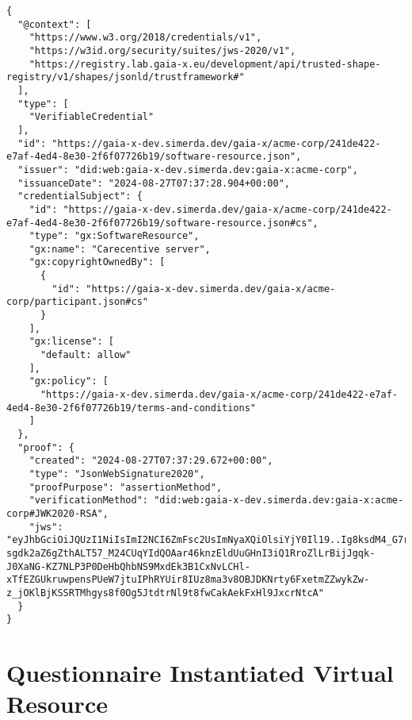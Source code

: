 \begin{verbatim}
{
  "@context": [
    "https://www.w3.org/2018/credentials/v1",
    "https://w3id.org/security/suites/jws-2020/v1",
    "https://registry.lab.gaia-x.eu/development/api/trusted-shape-registry/v1/shapes/jsonld/trustframework#"
  ],
  "type": [
    "VerifiableCredential"
  ],
  "id": "https://gaia-x-dev.simerda.dev/gaia-x/acme-corp/241de422-e7af-4ed4-8e30-2f6f07726b19/software-resource.json",
  "issuer": "did:web:gaia-x-dev.simerda.dev:gaia-x:acme-corp",
  "issuanceDate": "2024-08-27T07:37:28.904+00:00",
  "credentialSubject": {
    "id": "https://gaia-x-dev.simerda.dev/gaia-x/acme-corp/241de422-e7af-4ed4-8e30-2f6f07726b19/software-resource.json#cs",
    "type": "gx:SoftwareResource",
    "gx:name": "Carecentive server",
    "gx:copyrightOwnedBy": [
      {
        "id": "https://gaia-x-dev.simerda.dev/gaia-x/acme-corp/participant.json#cs"
      }
    ],
    "gx:license": [
      "default: allow"
    ],
    "gx:policy": [
      "https://gaia-x-dev.simerda.dev/gaia-x/acme-corp/241de422-e7af-4ed4-8e30-2f6f07726b19/terms-and-conditions"
    ]
  },
  "proof": {
    "created": "2024-08-27T07:37:29.672+00:00",
    "type": "JsonWebSignature2020",
    "proofPurpose": "assertionMethod",
    "verificationMethod": "did:web:gaia-x-dev.simerda.dev:gaia-x:acme-corp#JWK2020-RSA",
    "jws": "eyJhbGciOiJQUzI1NiIsImI2NCI6ZmFsc2UsImNyaXQiOlsiYjY0Il19..Ig8ksdM4_G7r2GbAkTRZPZXC3Q2owygDbwvTQrqT9arR7fdjMUSqOJXeALB9K3qZMlatIpc48MfPWu9KazFRQdu_CEHDlClY4I8_2zMW64UK9oyD5G-sgdk2aZ6gZthALT57_M24CUqYIdQOAar46knzEldUuGHnI3iQ1RroZlLrBijJgqk-J0XaNG-KZ7NLP3P0DeHbQhbNS9MxdEk3B1CxNvLCHl-xTfEZGUkruwpensPUeW7jtuIPhRYUir8IUz8ma3v8OBJDKNrty6FxetmZZwykZw-z_jOKlBjKSSRTMhgys8f0Og5JtdtrNl9t8fwCakAekFxHl9JxcrNtcA"
  }
}
\end{verbatim}

\section{Questionnaire Instantiated Virtual Resource}

